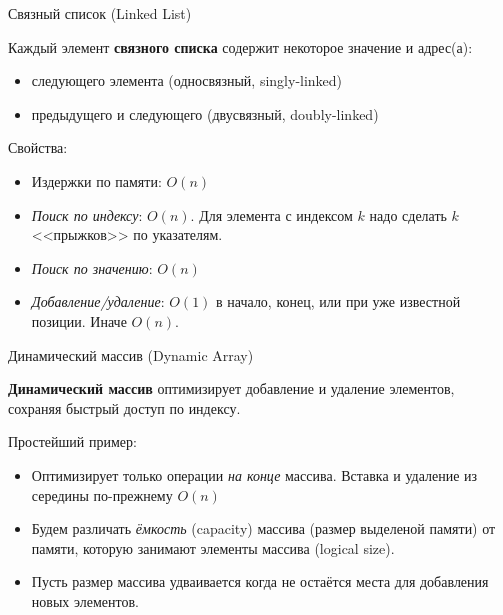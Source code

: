 
\begin{frame}{Связный список (Linked List)}
  
  Каждый элемент {\bf связного списка} содержит некоторое значение и адрес(а):
  \begin{itemize}
    \item следующего элемента (односвязный, singly-linked)
    \item предыдущего и следующего (двусвязный, doubly-linked)
  \end{itemize}


  Свойства:
  \begin{itemize}
    \item Издержки по памяти: $O(n)$
    \item {\em Поиск по индексу}: $O(n)$. Для элемента с индексом $k$ надо сделать $k$ <<прыжков>> по указателям.
    \item {\em Поиск по значению}: $O(n)$
    \item {\em Добавление/удаление}: $O(1)$ в начало, конец, или при уже известной позиции. Иначе $O(n)$.
  \end{itemize}

\end{frame}



\begin{frame}{Динамический массив (Dynamic Array)}
  
  {\bf Динамический массив} оптимизирует добавление и удаление элементов, сохраняя быстрый доступ по индексу.

  Простейший пример:%
  \begin{itemize}
    \item Оптимизирует только операции {\em на конце} массива. Вставка и удаление из середины по-прежнему $O(n)$
    \item Будем различать {\em ёмкость} (capacity) массива (размер выделеной памяти) от памяти, которую занимают элементы массива (logical size).
    \item Пусть размер массива удваивается когда не остаётся места для добавления новых элементов.
  \end{itemize}

\end{frame}


